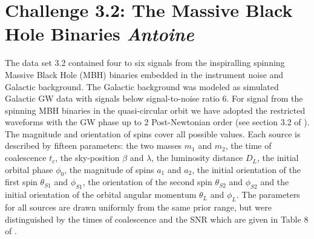 \documentclass{iopart}
\begin{document}
\section{Challenge 3.2: The Massive Black Hole Binaries {\it Antoine}}
The data set 3.2 contained four to six signals from the inspiralling spinning Massive Black Hole (MBH) binaries embedded in the instrument noise and Galactic background. The Galactic background was modeled as simulated 
Galactic GW data with signals below signal-to-noise ratio 6. 
For signal from the spinning MBH binaries in the quasi-circular orbit we have adopted the restricted waveforms with 
the GW phase up to 2 Post-Newtonian order (see section 3.2 of \cite{MLDC3}). The magnitude and orientation of spins cover all possible values.  Each source is described by fifteen parameters: the two masses $m_{1}$ and $m_{2}$, the time of coalescence $t_{c}$, the sky-position $\beta$ and $\lambda$, the luminosity distance $D_{L}$, the initial orbital phase $\phi_{0}$, the magnitude of spins $a_{1}$ and $a_{2}$, the initial orientation of the first spin  $\theta_{S1}$ and $\phi_{S1}$, the orientation of the second spin $\theta_{S2}$ and $\phi_{S2}$ and the initial orientation of the orbital angular momentum  $\theta_{L}$ and $\phi_{L}$. The parameters for all sources are drawn uniformly from the 
same prior range, but were distinguished by the times of coalescence and the SNR which are given in Table 8 of \cite{MLDC3}.
\end{document}
